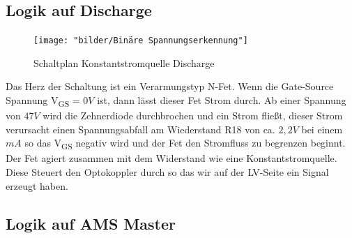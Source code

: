 \FloatBarrier
\subsection{Logik auf Discharge}
\label{sec: TSAL Logik Discharge}
\begin{figure}
	\centering
	\texttt{[image: "bilder/Binäre Spannungserkennung"]}
	\caption{Schaltplan Konstantstromquelle Discharge}
	\label{fig:binare-spannungserkennung}
\end{figure}

Das Herz der Schaltung ist ein Verarmungstyp N-Fet. Wenn die Gate-Source Spannung V\textsubscript{GS} = \ensuremath{0 V} ist, dann lässt dieser Fet Strom durch. Ab einer Spannung von \ensuremath{47 V} wird die Zehnerdiode durchbrochen und ein Strom fließt, dieser Strom verursacht einen Spannungsabfall am Wiederstand R18 von ca. \ensuremath{2,2 V} bei einem \ensuremath{mA} so das V\textsubscript{GS} negativ wird und der Fet den Stromfluss zu begrenzen beginnt. Der Fet agiert zusammen mit dem Widerstand wie eine Konstantstromquelle. Diese Steuert den Optokoppler durch so das wir auf der \ac{LV}-Seite ein Signal erzeugt haben.

\FloatBarrier
\subsection{Logik auf \ac{AMS} Master}

